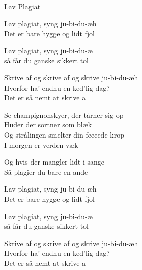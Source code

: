 \begin{song}{Lav Plagiat}
  \begin{SBChorus}
    Lav plagiat, syng ju-bi-du-æh  \\
    Det er bare hygge og lidt fjol \\ \medskip
   
    Lav plagiat, syng ju-bi-du-æ \\
    så får du ganske sikkert tol \\ \medskip
   
    Skrive af og skrive af og skrive ju-bi-du-æh \\
    Hvorfor ha' endnu en ked'lig dag? \\
    Det er så nemt at skrive a \\
  \end{SBChorus}
    


  \begin{SBVerse}
    Se champignonskyer, der tårner sig op \\
    Huder der sortner som blæk \\
    Og strålingen smelter din feeeede krop \\
    I morgen er verden væk \\ \medskip
  
    Og hvis der mangler lidt i sange \\
    Så plagier du bare en ande \\
  \end{SBVerse}
    
  \begin{SBChorus}
    Lav plagiat, syng ju-bi-du-æh  \\
    Det er bare hygge og lidt fjol \\ \medskip
   
    Lav plagiat, syng ju-bi-du-æ \\
    så får du ganske sikkert tol \\ \medskip
   
    Skrive af og skrive af og skrive ju-bi-du-æh \\
    Hvorfor ha' endnu en ked'lig dag? \\
    Det er så nemt at skrive a \\
  \end{SBChorus}
\end{song}